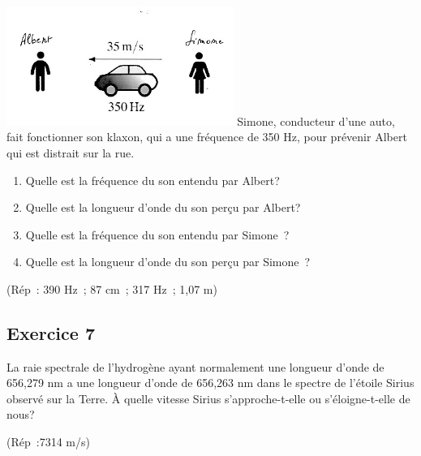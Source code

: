 \includegraphics[width=7.4cm,height=3.882cm]{Pictures/10000001000001A1000000DB0C45621DF12277A1.png}
Simone, conducteur d'une auto, fait fonctionner son klaxon, qui a une fréquence de
350 Hz, pour prévenir Albert qui est distrait sur la rue.
\begin{enumerate}
	\item Quelle est la fréquence du son entendu par Albert?
	\item Quelle est la longueur d'onde du son perçu par Albert?
	\item Quelle est la fréquence du son entendu par Simone~?
	\item Quelle est la longueur d'onde du son perçu par Simone~?
\end{enumerate}

(Rép~: 390 Hz~; 87 cm~; 317 Hz~; 1,07 m)

\subsection{Exercice 7}

La raie spectrale de l'hydrogène ayant normalement une longueur d'onde
de 656,279 nm a une longueur d'onde de 656,263 nm dans le spectre de
l'étoile Sirius observé sur la Terre. À quelle vitesse Sirius
s'approche-t-elle ou s'éloigne-t-elle de nous?

(Rép~:7314 m/s)
